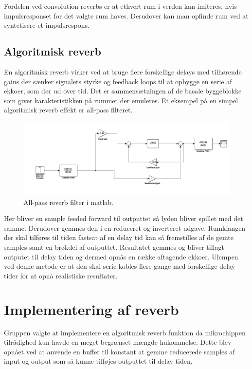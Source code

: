 Fordelen ved convolution reverbs er at ethvert rum i verden kan imiteres, hvis impulsresponset for det valgte rum haves.\newline
Derudover kan man opfinde rum ved at syntetisere et impulsrespons.

\subsection{Algoritmisk reverb}
En algoritmisk reverb virker ved at bruge flere forskellige delays med tilhørende gains der sænker signalets styrke og feedback loops til at opbygge en serie af ekkoer, som dør ud over tid.
Det er sammensætningen af de basale byggeblokke som giver karakteristikken på rummet der emuleres.\newline
Et eksempel på en simpel algoritmisk reverb effekt er all-pass filteret.
\begin{figure}[h]
\includegraphics[width=0.8\linewidth]{./billeder/reverb-testopsaetning.png}
\caption{All-pass reverb filter i matlab.}
\label{fig:allPassMatLab}
\end{figure}
Her bliver en sample feeded forward til outputtet så lyden bliver spillet med det samme.
Derudover gemmes den i en reduceret og inverteret udgave. %
Rumklangen der skal tilføres til tiden fastsat af en delay tid kan så fremstilles af de gemte samples samt en brøkdel af outputtet.
Resultatet gemmes og bliver tillagt outputet til delay tiden og dermed opnås en række aftagende ekkoer.
Ulempen ved denne metode er at den skal serie kobles flere gange med forskellige delay tider for at opnå realistiske resultater.



\section{Implementering af reverb}
Gruppen valgte at implementere en algoritmisk reverb funktion da mikrochippen tilrådighed kun havde en meget begrænset mængde hukommelse.
Dette blev opnået ved at anvende en buffer til konstant at gemme reducerede samples af input og output som så kunne tilføjes outputtet til delay tiden.

